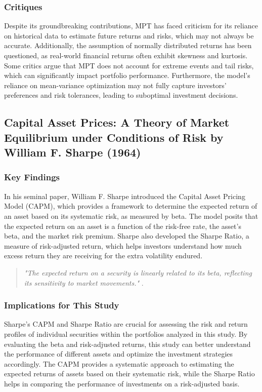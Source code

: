 \subsubsection{Critiques}
Despite its groundbreaking contributions, MPT has faced criticism for its reliance on historical data to estimate future returns and risks, which may not always be accurate. Additionally, the assumption of normally distributed returns has been questioned, as real-world financial returns often exhibit skewness and kurtosis. Some critics argue that MPT does not account for extreme events and tail risks, which can significantly impact portfolio performance. Furthermore, the model's reliance on mean-variance optimization may not fully capture investors' preferences and risk tolerances, leading to suboptimal investment decisions.

\subsection{Capital Asset Prices: A Theory of Market Equilibrium under Conditions of Risk by William F. Sharpe (1964)}

\subsubsection{Key Findings}
In his seminal paper, William F. Sharpe introduced the Capital Asset Pricing Model (CAPM), which provides a framework to determine the expected return of an asset based on its systematic risk, as measured by beta. The model posits that the expected return on an asset is a function of the risk-free rate, the asset's beta, and the market risk premium. Sharpe also developed the Sharpe Ratio, a measure of risk-adjusted return, which helps investors understand how much excess return they are receiving for the extra volatility endured.

\begin{quote}
\textit{"The expected return on a security is linearly related to its beta, reflecting its sensitivity to market movements."} \citep{sharpe1964capital}.
\end{quote}


\subsubsection{Implications for This Study}
Sharpe's CAPM and Sharpe Ratio are crucial for assessing the risk and return profiles of individual securities within the portfolios analyzed in this study. By evaluating the beta and risk-adjusted returns, this study can better understand the performance of different assets and optimize the investment strategies accordingly. The CAPM provides a systematic approach to estimating the expected returns of assets based on their systematic risk, while the Sharpe Ratio helps in comparing the performance of investments on a risk-adjusted basis.

